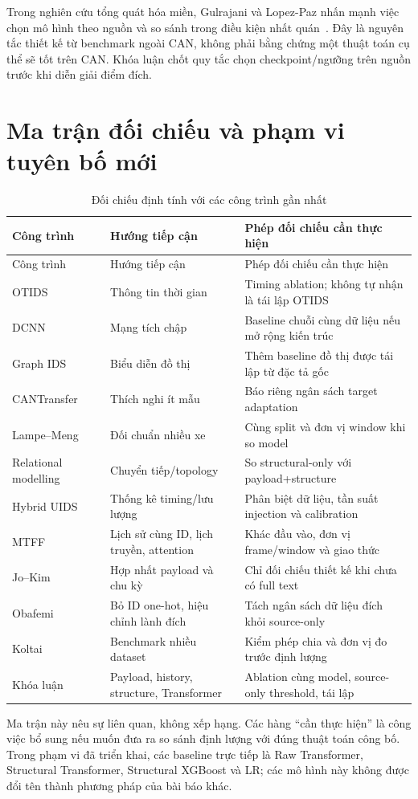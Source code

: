 \documentclass[12pt,a4paper,oneside,openany]{extbook}
\begin{document}
Trong nghiên cứu tổng quát hóa miền, Gulrajani và Lopez-Paz nhấn mạnh việc chọn mô hình theo nguồn và so sánh trong điều kiện nhất quán~\cite{gulrajani2021domainbed}. Đây là nguyên tắc thiết kế từ benchmark ngoài CAN, không phải bằng chứng một thuật toán cụ thể sẽ tốt trên CAN. Khóa luận chốt quy tắc chọn checkpoint/ngưỡng trên nguồn trước khi diễn giải điểm đích.

\section{Ma trận đối chiếu và phạm vi tuyên bố mới}
\begin{longtable}{P{3.4cm}P{4.3cm}P{5.2cm}}
\caption{Đối chiếu định tính với các công trình gần nhất}\label{tab:related}\\\toprule
Công trình & Hướng tiếp cận & Phép đối chiếu cần thực hiện\\\midrule\endfirsthead
\toprule Công trình & Hướng tiếp cận & Phép đối chiếu cần thực hiện\\\midrule\endhead
OTIDS~\cite{lee2017otids} & Thông tin thời gian & Timing ablation; không tự nhận là tái lập OTIDS\\
DCNN~\cite{song2020dcnn} & Mạng tích chập & Baseline chuỗi cùng dữ liệu nếu mở rộng kiến trúc\\
Graph IDS~\cite{islam2020graph} & Biểu diễn đồ thị & Thêm baseline đồ thị được tái lập từ đặc tả gốc\\
CANTransfer~\cite{tariq2020cantransfer} & Thích nghi ít mẫu & Báo riêng ngân sách target adaptation\\
Lampe--Meng~\cite{lampe2024curated} & Đối chuẩn nhiều xe & Cùng split và đơn vị window khi so model\\
Relational modelling~\cite{khreasat2026relational} & Chuyển tiếp/topology & So structural-only với payload+structure\\
Hybrid UIDS~\cite{s26051489} & Thống kê timing/lưu lượng & Phân biệt dữ liệu, tần suất injection và calibration\\
MTFF~\cite{dong2026mtff} & Lịch sử cùng ID, lịch truyền, attention & Khác đầu vào, đơn vị frame/window và giao thức\\
Jo--Kim~\cite{jo2026fusion} & Hợp nhất payload và chu kỳ & Chỉ đối chiếu thiết kế khi chưa có full text\\
Obafemi~\cite{obafemi2026travel} & Bỏ ID one-hot, hiệu chỉnh lành đích & Tách ngân sách dữ liệu đích khỏi source-only\\
Koltai~\cite{koltai2026trust} & Benchmark nhiều dataset & Kiểm phép chia và đơn vị đo trước định lượng\\
Khóa luận & Payload, history, structure, Transformer & Ablation cùng model, source-only threshold, tái lập\\\bottomrule
\end{longtable}
Ma trận này nêu sự liên quan, không xếp hạng. Các hàng ``cần thực hiện'' là công việc bổ sung nếu muốn đưa ra so sánh định lượng với đúng thuật toán công bố. Trong phạm vi đã triển khai, các baseline trực tiếp là Raw Transformer, Structural Transformer, Structural XGBoost và LR; các mô hình này không được đổi tên thành phương pháp của bài báo khác.
\end{document}
